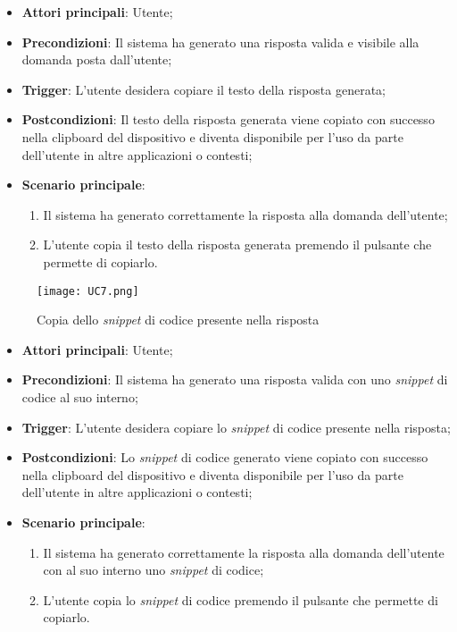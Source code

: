 \begin{itemize}
    \item \textbf{Attori principali}: Utente;
    \item \textbf{Precondizioni}: Il sistema ha generato una risposta valida e visibile alla domanda posta dall'utente;
    \item \textbf{Trigger}: L'utente desidera copiare il testo della risposta generata;
    \item \textbf{Postcondizioni}: Il testo della risposta generata viene copiato con successo nella clipboard del dispositivo e 
    diventa disponibile per l'uso da parte dell'utente in altre applicazioni o contesti;
    \item \textbf{Scenario principale}:
    \begin{enumerate}
        \item Il sistema ha generato correttamente la risposta alla domanda dell'utente;
        \item L'utente copia il testo della risposta generata premendo il pulsante che permette di copiarlo.
    \end{enumerate}
\end{itemize}


\hypertarget{UC7}{}

\begin{figure}[h]
    \centering
    \texttt{[image: UC7.png]}
    \caption{Copia dello \emph{snippet} di codice presente nella risposta}
\end{figure}

\begin{itemize}
    \item \textbf{Attori principali}: Utente;
    \item \textbf{Precondizioni}: Il sistema ha generato una risposta valida con uno \emph{snippet} di codice al suo interno;
    \item \textbf{Trigger}: L'utente desidera copiare lo \emph{snippet} di codice presente nella risposta;
    \item \textbf{Postcondizioni}: Lo \emph{snippet} di codice generato viene copiato con successo nella clipboard del dispositivo e diventa disponibile per l'uso da parte dell'utente in altre applicazioni o contesti;
    \item \textbf{Scenario principale}:
    \begin{enumerate}
        \item Il sistema ha generato correttamente la risposta alla domanda dell'utente con al suo interno uno \emph{snippet} di codice;
        \item L'utente copia lo \emph{snippet} di codice premendo il pulsante che permette di copiarlo.
    \end{enumerate}
\end{itemize}


